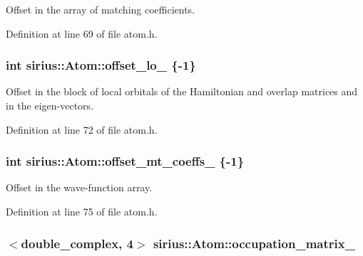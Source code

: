 Offset in the array of matching coefficients. 



Definition at line 69 of file atom.\+h.

\hypertarget{classsirius_1_1_atom_ae653666636a40ecd1f48595d744a7ad4}{}
\subsubsection[{offset\+\_\+lo\+\_\+}]{\setlength{\rightskip}{0pt plus 5cm}int sirius\+::\+Atom\+::offset\+\_\+lo\+\_\+ \{-\/1\}\hspace{0.3cm}{\ttfamily [private]}}\label{classsirius_1_1_atom_ae653666636a40ecd1f48595d744a7ad4}


Offset in the block of local orbitals of the Hamiltonian and overlap matrices and in the eigen-\/vectors. 



Definition at line 72 of file atom.\+h.

\hypertarget{classsirius_1_1_atom_a0b5a7713f5d959a10c5924288c9c0fc4}{}
\subsubsection[{offset\+\_\+mt\+\_\+coeffs\+\_\+}]{\setlength{\rightskip}{0pt plus 5cm}int sirius\+::\+Atom\+::offset\+\_\+mt\+\_\+coeffs\+\_\+ \{-\/1\}\hspace{0.3cm}{\ttfamily [private]}}\label{classsirius_1_1_atom_a0b5a7713f5d959a10c5924288c9c0fc4}


Offset in the wave-\/function array. 



Definition at line 75 of file atom.\+h.

\hypertarget{classsirius_1_1_atom_a8c4ee868930d86572a234d1c10dd8afc}{}
\subsubsection[{occupation\+\_\+matrix\+\_\+}]{$<$double\+\_\+complex, 4$>$ sirius\+::\+Atom\+::occupation\+\_\+matrix\+\_\+\hspace{0.3cm}{\ttfamily [private]}}\label{classsirius_1_1_atom_a8c4ee868930d86572a234d1c10dd8afc}


